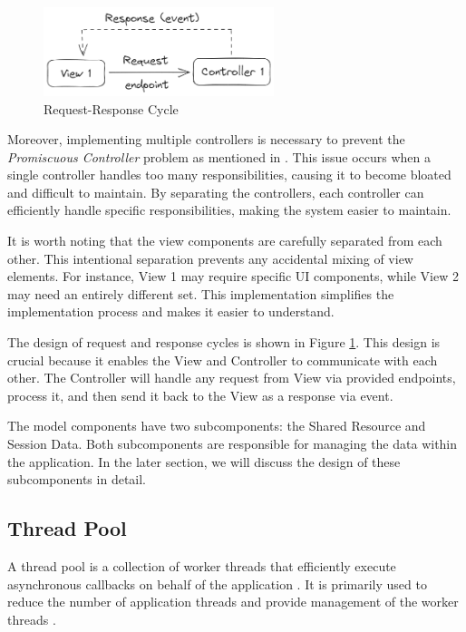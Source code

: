 \begin{figure}[!ht]
    \centering
    \includegraphics[width=0.6\textwidth]{texs/Part2/chapter3/image/reqres.png}
    \caption{Request-Response Cycle}
    \label{fig:reqres}
\end{figure}

Moreover, implementing multiple controllers is necessary to prevent the \textit{Promiscuous Controller} problem as mentioned in \cite[2127]{Aniche2017}. This issue occurs when a single controller handles too many responsibilities, causing it to become bloated and difficult to maintain. By separating the controllers, each controller can efficiently handle specific responsibilities, making the system easier to maintain.

It is worth noting that the view components are carefully separated from each other. This intentional separation prevents any accidental mixing of view elements. For instance, View 1 may require specific UI components, while View 2 may need an entirely different set. This implementation simplifies the implementation process and makes it easier to understand.

The design of request and response cycles is shown in Figure \ref{fig:reqres}. This design is crucial because it enables the View and Controller to communicate with each other. The Controller will handle any request from View via provided endpoints, process it, and then send it back to the View as a response via event.

The model components have two subcomponents: the Shared Resource and Session Data. Both subcomponents are responsible for managing the data within the application. In the later section, we will discuss the design of these subcomponents in detail.

\subsection{Thread Pool}
\label{subsec:thread-pool}

A thread pool is a collection of worker threads that efficiently execute asynchronous callbacks on behalf of the application \cite{Karl-Bridge-Microsoft}. It is primarily used to reduce the number of application threads and provide management of the worker threads \cite{Karl-Bridge-Microsoft}.


